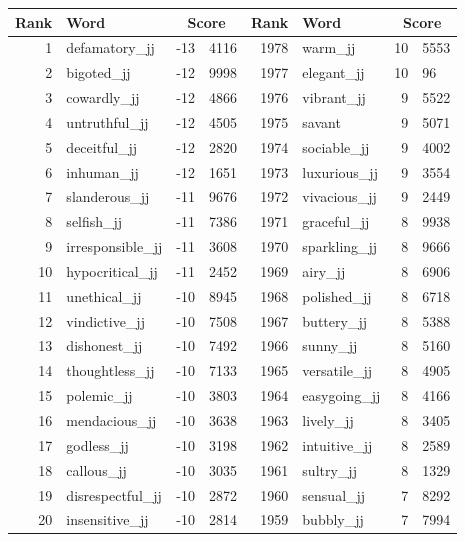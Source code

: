 \begin{table}[tbp]
    \begin{tabular}{| rlr@{.}l | rlr@{.}l |}
    \hline
    \textbf{Rank} & \textbf{Word} & \multicolumn{2}{c|}{\textbf{Score}} & \textbf{Rank} & \textbf{Word} & \multicolumn{2}{c|}{\textbf{Score}} \\
    \hline
    1 & defamatory\_jj & -13 & 4116    &    1978 & warm\_jj & 10 & 5553 \\
    2 & bigoted\_jj & -12 & 9998    &    1977 & elegant\_jj & 10 & 96 \\
    3 & cowardly\_jj & -12 & 4866    &    1976 & vibrant\_jj & 9 & 5522 \\
    4 & untruthful\_jj & -12 & 4505    &    1975 & savant & 9 & 5071 \\
    5 & deceitful\_jj & -12 & 2820    &    1974 & sociable\_jj & 9 & 4002 \\
    6 & inhuman\_jj & -12 & 1651    &    1973 & luxurious\_jj & 9 & 3554 \\
    7 & slanderous\_jj & -11 & 9676    &    1972 & vivacious\_jj & 9 & 2449 \\
    8 & selfish\_jj & -11 & 7386    &    1971 & graceful\_jj & 8 & 9938 \\
    9 & irresponsible\_jj & -11 & 3608    &    1970 & sparkling\_jj & 8 & 9666 \\
    10 & hypocritical\_jj & -11 & 2452    &    1969 & airy\_jj & 8 & 6906 \\
    11 & unethical\_jj & -10 & 8945    &    1968 & polished\_jj & 8 & 6718 \\
    12 & vindictive\_jj & -10 & 7508    &    1967 & buttery\_jj & 8 & 5388 \\
    13 & dishonest\_jj & -10 & 7492    &    1966 & sunny\_jj & 8 & 5160 \\
    14 & thoughtless\_jj & -10 & 7133    &    1965 & versatile\_jj & 8 & 4905 \\
    15 & polemic\_jj & -10 & 3803    &    1964 & easygoing\_jj & 8 & 4166 \\
    16 & mendacious\_jj & -10 & 3638    &    1963 & lively\_jj & 8 & 3405 \\
    17 & godless\_jj & -10 & 3198    &    1962 & intuitive\_jj & 8 & 2589 \\
    18 & callous\_jj & -10 & 3035    &    1961 & sultry\_jj & 8 & 1329 \\
    19 & disrespectful\_jj & -10 & 2872    &    1960 & sensual\_jj & 7 & 8292 \\
    20 & insensitive\_jj & -10 & 2814    &    1959 & bubbly\_jj & 7 & 7994 \\

\end{tabular}
\end{table}
